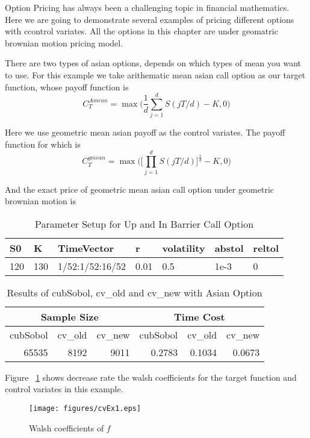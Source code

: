 Option Pricing has always been a challenging topic in financial mathematics.
Here we are going to demonstrate several examples of pricing different options with ccontrol variates.
All the options in this chapter are under geomatric brownian motion pricing model. 


There are two types of asian options, depends on which types of mean you want to use. For this example we take arithematic mean asian call option as our target function, whose payoff function is
\[ C_{T}^{Amean} = \max\Big(\frac{1}{d}\sum_{j=1}^{d}S(jT/d)-K, 0\Big)\]

Here we use geometric mean asian payoff as the control variates. The payoff function for which is 
\[ C_{T}^{gmean} = \max\Big(\Big[\prod_{j=1}^{d}S(jT/d) \Big]^\frac{1}{d}-K, 0\Big)\]

And the exact price of geometric mean asian call option under geometric brownian motion is

\begin{table}[h]
    \centering
	\caption{Parameter Setup for Up and In Barrier Call Option}
	\begin{tabular}{lllllll}
		\hline\hline
        S0 & K & TimeVector & r & volatility & abstol & reltol \\[0.5ex]
        \hline
        120  & 130 & 1/52:1/52:16/52 & 0.01 & 0.5 & 1e-3 & 0\\[1ex] 
        \hline
	\end{tabular}
\end{table}

\begin{table}[h]
    \centering
	\caption{Results of cubSobol, cv\_old and cv\_new with Asian Option}
    \begin{tabular}{rrrrrr}  
    \hline\hline
	\multicolumn{3}{c}{Sample Size}
		&\multicolumn{3}{c}{Time Cost} \\
    \hline
	 cubSobol&cv\_old&cv\_new
    &cubSobol&cv\_old&cv\_new\\[0.5ex]
    \hline
		 65535&8192&9011
    &0.2783&0.1034&0.0673\\[1ex]
    \hline
	\end{tabular}
\end{table}

Figure ~\ref{fg:cvEX1} shows decrease rate the walsh coefficients for the target function and control variates in this example.

\begin{figure}[h]
    \centering
    \texttt{[image: figures/cvEx1.eps]}
    \label{fg:cvEX1}
    \caption{Walsh coefficients of $f$}
\end{figure}

